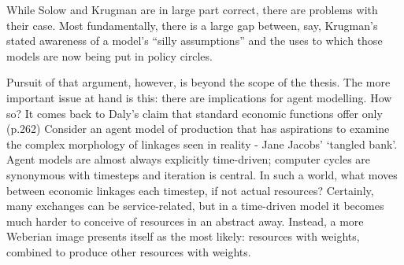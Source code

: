 While Solow and Krugman are in large part correct, there are problems  with their case. Most fundamentally, there is a large gap between, say, Krugman's stated awareness of a model's ``silly assumptions'' and the uses to which those models are now being put in policy circles. 

Pursuit of that argument, however, is beyond the scope of the thesis. The more important issue at hand is this: there are implications for agent modelling. How so? It comes back to Daly's claim that standard economic functions offer only 	 (p.262) Consider an agent model of production that has aspirations to examine the complex morphology of linkages seen in reality - Jane Jacobs' `tangled bank'. Agent models are almost always explicitly time-driven; computer cycles are synonymous with timesteps and iteration is central. In such a world, what moves between economic linkages each timestep, if not actual resources? Certainly, many exchanges can be service-related, but in a time-driven model it becomes much harder to conceive of resources in an abstract away. Instead, a more Weberian image presents itself as the most likely:
resources with weights, combined to produce other resources with weights.